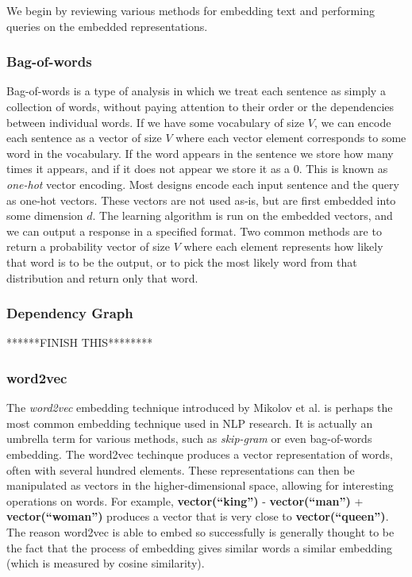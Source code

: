 \documentclass[pageno]{jpaper}
\begin{document}
We begin by reviewing various methods for embedding text and performing queries
on the embedded representations. \\

\subsubsection{Bag-of-words}
\label{Bag-of-words}

Bag-of-words is a type of analysis in which we treat each sentence as simply a
collection of words, without paying attention to their order or the dependencies
between individual words. If we have some vocabulary of size $V$, we can encode
each sentence as a vector of size $V$ where each vector element corresponds to
some word in the vocabulary. If the word appears in the sentence we store how
many times it appears, and if it does not appear we store it as a 0. This is
known as \textit{one-hot} vector encoding. Most designs encode each input
sentence and the query as one-hot vectors. These vectors are not used as-is, but
are first embedded into some dimension $d$. The learning algorithm is run on the
embedded vectors, and we can output a response in a specified format. Two common
methods are to return a probability vector of size $V$ where each element
represents how likely that word is to be the output, or to pick the most likely
word from that distribution and return only that word. \\

\subsubsection{Dependency Graph}
\label{Dependency Graph}
******FINISH THIS******** \\

\subsubsection{word2vec}
\label{word2vec}

The \textit{word2vec} embedding technique introduced by Mikolov et al.
\cite{Mikolov2013} is perhaps the most common embedding technique used in NLP
research. It is actually an umbrella term for various methods, such as
\textit{skip-gram} or even bag-of-words embedding. The word2vec techinque
produces a vector representation of words, often with several hundred elements.
These representations can then be manipulated as vectors in the
higher-dimensional space, allowing for interesting operations on words. For
example, \textbf{vector(``king'')} - \textbf{vector(``man'')} +
\textbf{vector(``woman'')} produces a vector that is very close to
\textbf{vector(``queen'')}. The reason word2vec is able to embed so successfully
is generally thought to be the fact that the process of embedding gives
similar words a similar embedding (which is measured by cosine similarity). \\
\end{document}
